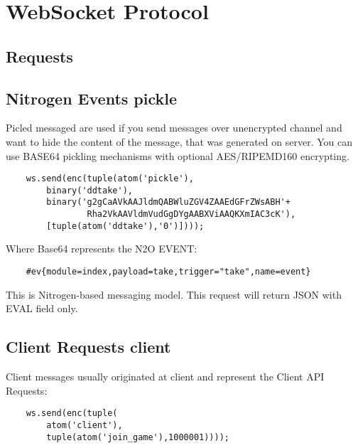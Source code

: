 \section{WebSocket Protocol}

\subsection*{Requests}

\subsection{Nitrogen Events {\bf pickle}}

Picled messaged are used if you send messages over unencrypted
channel and want to hide the content of the message,
that was generated on server. You can use BASE64 pickling mechanisms
with optional AES/RIPEMD160 encrypting.

\vspace{1\baselineskip}
\begin{lstlisting}
    ws.send(enc(tuple(atom('pickle'),
        binary('ddtake'),
        binary('g2gCaAVkAAJldmQABWluZGV4ZAAEdGFrZWsABH'+
                Rha2VkAAVldmVudGgDYgAABXViAAQKXmIAC3cK'),
        [tuple(atom('ddtake'),'0')])));
\end{lstlisting}
\vspace{1\baselineskip}

Where Base64 represents the N2O EVENT:

\vspace{1\baselineskip}
\begin{lstlisting}
    #ev{module=index,payload=take,trigger="take",name=event}
\end{lstlisting}
\vspace{1\baselineskip}

This is Nitrogen-based messaging model.
This request will return JSON with EVAL field only.

\subsection{Client Requests {\bf client}}

Client messages usually originated at client and represent the Client API Requests:

\vspace{1\baselineskip}
\begin{lstlisting}
    ws.send(enc(tuple(
        atom('client'),
        tuple(atom('join_game'),1000001))));
\end{lstlisting}
\vspace{1\baselineskip}

